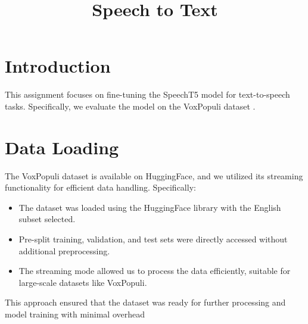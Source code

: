 \documentclass[12pt]{article}
\title{Speech to Text}
\begin{document}
\maketitle




\section*{Introduction}
This assignment focuses on fine-tuning the SpeechT5 model for text-to-speech tasks. Specifically, we   evaluate the model on the VoxPopuli dataset .

\section*{Data Loading}
The VoxPopuli dataset is available on HuggingFace, and we utilized its streaming functionality for efficient data handling. Specifically:
\begin{itemize}
\item The dataset was loaded using the HuggingFace library with the English subset selected.
\item Pre-split training, validation, and test sets were directly accessed without additional preprocessing.
\item The streaming mode allowed us to process the data efficiently, suitable for large-scale datasets like VoxPopuli.
\end{itemize}
This approach ensured that the dataset was ready for further processing and model training with minimal overhead
\end{document}
